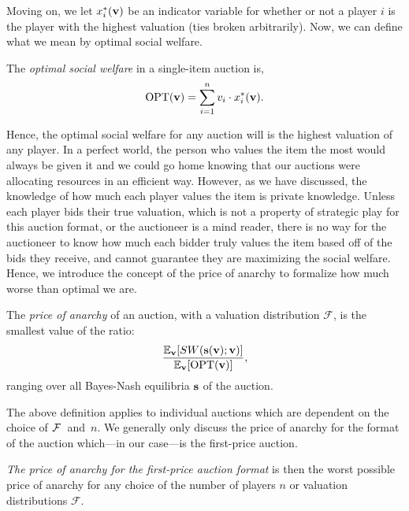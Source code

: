 \documentclass[12pt,twoside]{reedthesis}
\begin{document}
Moving on, we let $x^*_i(\textbf{v})$ be an indicator variable for whether or not a player $i$ is the player with the highest valuation (ties broken arbitrarily). Now, we can define what we mean by optimal social welfare. 

\begin{dfn}
	The {\em optimal social welfare} in a single-item auction is, 
	$$ \text{OPT}( \textbf{v}) = \sum_{i=1}^{n} v_i \cdot x^*_i (\textbf{v}).$$
\end{dfn}
Hence, the optimal social welfare for any auction will is the highest valuation of any player. In a perfect world, the person who values the item the most would always be given it and we could go home knowing that our auctions were allocating resources in an efficient way. However, as we have discussed, the knowledge of how much each player values the item is private knowledge. Unless each player bids their true valuation, which is not a property of strategic play for this auction format, or the auctioneer is a mind reader, there is no way for the auctioneer to know how much each bidder truly values the item based off of the bids they receive, and cannot guarantee they are maximizing the social welfare. Hence, we introduce the concept of the price of anarchy to formalize how much worse than optimal we are.
 
\begin{dfn}
	The \textit{price of anarchy} of an auction, with a valuation distribution $\mathcal{F}$, is the smallest value of the ratio:
	\begin{equation}
	\frac{\mathbb{E}_{\textbf{v}} [SW(\textbf{s}(\textbf{v});\textbf{v})]}{\mathbb{E}_{\textbf{v}}[\text{OPT}(\textbf{v})]},
	\end{equation}
	ranging over all Bayes-Nash equilibria $\textbf{s}$ of the auction.
	\label{dfn:POA}
\end{dfn}

The above definition applies to individual auctions which are dependent on the choice of $\mathcal{F}$~and~$n$. We generally only discuss the price of anarchy for the format of the auction which---in our case---is the first-price auction.

\begin{dfn} 
{\em The price of anarchy for the first-price auction format} is then the worst possible price of anarchy for any choice of the number of players $n$ or valuation distributions $\mathcal{F}$.
\label{dfn:FormatPOA}
\end{dfn}
\end{document}
